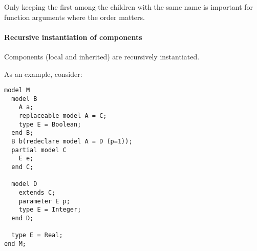 \begin{nonnormative}
Only keeping the first among the children with the same name is important for function arguments where the order matters.
\end{nonnormative}

\paragraph*{Recursive instantiation of components}\label{recursive-instantiation-of-components}

Components (local and inherited) are recursively instantiated.

\begin{example}
As an example, consider:
\begin{lstlisting}[language=modelica]
model M
  model B
    A a;
    replaceable model A = C;
    type E = Boolean;
  end B;
  B b(redeclare model A = D (p=1));
  partial model C
    E e;
  end C;

  model D
    extends C;
    parameter E p;
    type E = Integer;
  end D;

  type E = Real;
end M;
\end{lstlisting}


\end{example}
